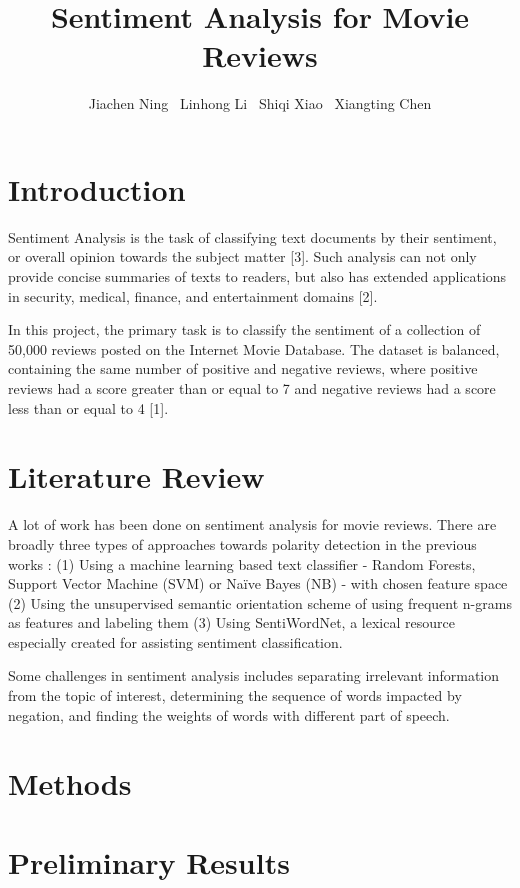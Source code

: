 \documentclass{article}
\title{Sentiment Analysis for Movie Reviews}
\author{%
  Jiachen Ning \ Linhong Li \ Shiqi Xiao \ Xiangting Chen 
}
\begin{document}

\maketitle

\section{Introduction}

Sentiment Analysis is the task of classifying text documents by their sentiment, or overall opinion towards the subject matter [3]. Such analysis can not only provide concise summaries of texts to readers, but also has extended applications in security, medical, finance, and entertainment domains [2].

In this project, the primary task is to classify the sentiment of a collection of 50,000 reviews posted on the Internet Movie Database. The dataset is balanced, containing the same number of positive and negative reviews, where positive reviews had a score greater than or equal to 7 and negative reviews had a score less than or equal to 4 [1]. 


\section{Literature Review}

A lot of work has been done on sentiment analysis for movie reviews. There are broadly three types of approaches towards polarity detection in the previous works : (1) Using a machine learning based text classifier - Random Forests, Support Vector Machine (SVM) or Na{\"i}ve Bayes (NB) - with chosen feature space (2) Using the unsupervised semantic orientation scheme of using frequent n-grams as features and labeling them (3) Using SentiWordNet, a lexical resource especially created for assisting sentiment classification.

Some challenges in sentiment analysis includes separating irrelevant information from the topic of interest, determining the sequence of words impacted by negation, and finding the weights of words with different part of speech.

\section{Methods}

\section{Preliminary Results}
\end{document}
